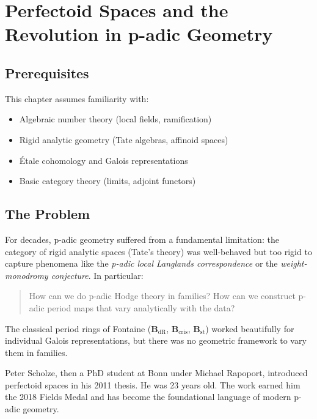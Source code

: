 \let\LocalMacro\relax

\chapter{Perfectoid Spaces and the Revolution in p-adic Geometry}

\section{Prerequisites}
This chapter assumes familiarity with:
\begin{itemize}
\item Algebraic number theory (local fields, ramification)
\item Rigid analytic geometry (Tate algebras, affinoid spaces)
\item \'Etale cohomology and Galois representations
\item Basic category theory (limits, adjoint functors)
\end{itemize}

\section{The Problem}
For decades, p-adic geometry suffered from a fundamental limitation: the category of rigid analytic spaces (Tate's theory) was well-behaved but too rigid to capture phenomena like the \emph{p-adic local Langlands correspondence} or the \emph{weight-monodromy conjecture}. In particular:

\begin{quote}
How can we do p-adic Hodge theory in families? How can we construct p-adic period maps that vary analytically with the data?
\end{quote}

The classical period rings of Fontaine ($\mathbf{B}_{\text{dR}}$, $\mathbf{B}_{\text{cris}}$, $\mathbf{B}_{\text{st}}$) worked beautifully for individual Galois representations, but there was no geometric framework to vary them in families.

\begin{historicalbox}
Peter Scholze, then a PhD student at Bonn under Michael Rapoport, introduced perfectoid spaces in his 2011 thesis. He was 23 years old. The work earned him the 2018 Fields Medal and has become the foundational language of modern p-adic geometry.
\end{historicalbox}

